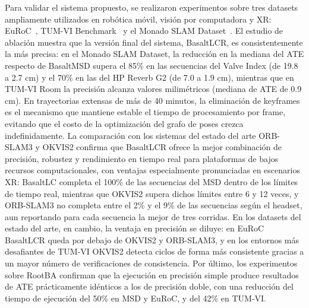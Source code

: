 Para validar el sistema propuesto, se realizaron experimentos sobre tres datasets ampliamente utilizados en robótica móvil, visión por computadora y XR: EuRoC~\cite{burri2016euroc}, TUM-VI Benchmark~\cite{schubert2018tum} y el Monado SLAM Dataset~\cite{demayo2025monadoslamdataset}. El estudio de ablación muestra que la versión final del sistema, BasaltLCR, es consistentemente la más precisa: en el Monado SLAM Dataset, la reducción en la mediana del ATE respecto de BasaltMSD supera el 85\% en las secuencias del Valve Index (de 19.8 a 2.7 cm) y el 70\% en las del HP Reverb G2 (de 7.0 a 1.9 cm), mientras que en TUM-VI Room la precisión alcanza valores milimétricos (mediana de ATE de 0.9 cm). En trayectorias extensas de más de 40 minutos, la eliminación de keyframes es el mecanismo que mantiene estable el tiempo de procesamiento por frame, evitando que el costo de la optimización del grafo de poses crezca indefinidamente. La comparación con los sistemas del estado del arte ORB-SLAM3 y OKVIS2 confirma que BasaltLCR ofrece la mejor combinación de precisión, robustez y rendimiento en tiempo real para plataformas de bajos recursos computacionales, con ventajas especialmente pronunciadas en escenarios XR: BasaltLC completa el 100\% de las secuencias del MSD dentro de los límites de tiempo real, mientras que OKVIS2 supera dichos límites entre 6 y 12 veces, y ORB-SLAM3 no completa entre el 2\% y el 9\% de las secuencias según el headset, aun reportando para cada secuencia la mejor de tres corridas. En los datasets del estado del arte, en cambio, la ventaja en precisión se diluye: en EuRoC BasaltLCR queda por debajo de OKVIS2 y ORB-SLAM3, y en los entornos más desafiantes de TUM-VI OKVIS2 detecta ciclos de forma más consistente gracias a un mayor número de verificaciones de consistencia. Por último, los experimentos sobre RootBA confirman que la ejecución en precisión simple produce resultados de ATE prácticamente idénticos a los de precisión doble, con una reducción del tiempo de ejecución del 50\% en MSD y EuRoC, y del 42\% en TUM-VI.


